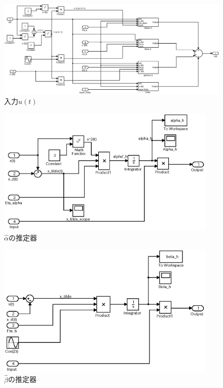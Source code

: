 \documentclass[a4paper,12pt]{jarticle}
\begin{document}
%
%
\begin{figure}[tb]
    \begin{center}
       \includegraphics[width=170mm]{fig/input.eps}
        \caption{入力$u(t)$}
        \label{fig:input}
    \end{center}
 \end{figure}
\begin{figure}[htb]
    \begin{center}
       \includegraphics[width=105mm]{fig/alpha.eps}
        \caption{$\hat{\alpha}$の推定器}
        \label{fig:alpha}
    \end{center}
 \end{figure}
%
\begin{figure}[htb]
    \begin{center}
       \includegraphics[width=105mm]{fig/beta.eps}
        \caption{$\hat{\beta}$の推定器}
        \label{fig:beta}
    \end{center}
 \end{figure}
\end{document}
